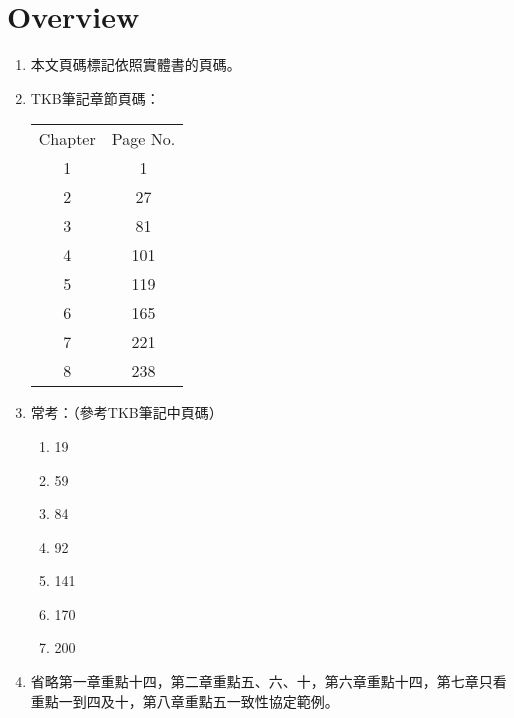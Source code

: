 \section{Overview}

\begin{enumerate}
    \item 本文頁碼標記依照實體書\cite{1}\cite{2}的頁碼。
    \item TKB筆記\cite{3}章節頁碼：
    \begin{table}[H]
        \centering
        \begin{tabular}{|c|c|}
            \hline
            Chapter & Page No. \\
            \Xhline{2\arrayrulewidth}
            1 & 1 \\
            \hline
            2 & 27 \\
            \hline
            3 & 81 \\
            \hline
            4 & 101 \\
            \hline
            5 & 119 \\
            \hline
            6 & 165 \\
            \hline
            7 & 221 \\
            \hline
            8 & 238 \\
            \hline
        \end{tabular}
    \end{table}
    \item 常考：（參考TKB筆記\cite{3}中頁碼）
    \begin{enumerate}
        \item 19 
        \item 59
        \item 84
        \item 92
        \item 141
        \item 170
        \item 200
    \end{enumerate}
    \item 省略第一章重點十四，第二章重點五、六、十，第六章重點十四，第七章只看重點一到四及十，第八章重點五一致性協定範例。
\end{enumerate}

\pagebreak